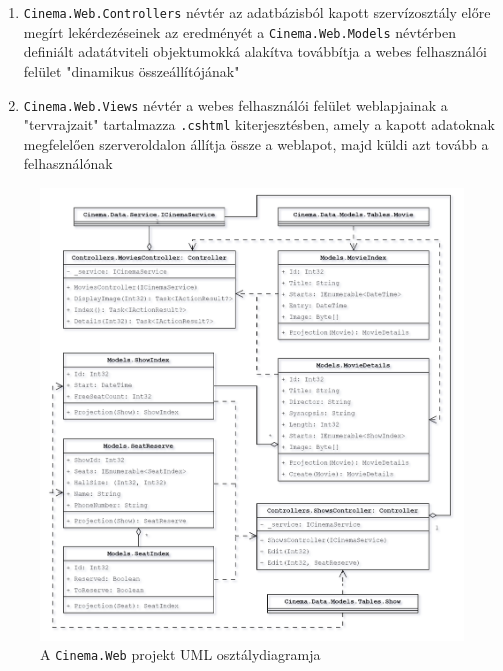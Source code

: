 \documentclass{article}
\begin{document}
\begin{itemize}
\begin{enumerate}
			\begin{enumerate}
				\item \texttt{Cinema.Web.Controllers} névtér az adatbázisból kapott szervízosztály előre megírt lekérdezéseinek az eredményét a \texttt{Cinema.Web.Models} névtérben definiált adatátviteli objektumokká alakítva továbbítja a webes felhasználói felület "dinamikus összeállítójának"
				\item \texttt{Cinema.Web.Views} névtér a webes felhasználói felület weblapjainak a "tervrajzait" tartalmazza \texttt{.cshtml} kiterjesztésben, amely a kapott adatoknak megfelelően szerveroldalon állítja össze a weblapot, majd küldi azt tovább a felhasználónak
			\end{enumerate}
			\begin{figure}[H]
				\centering
				\includegraphics[width=\textwidth]{web}
				\caption{A \texttt{Cinema.Web} projekt UML osztálydiagramja}
			\end{figure}
		\end{enumerate}
	\end{itemize}
\end{document}

